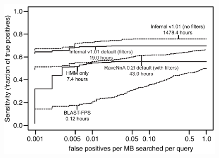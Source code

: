 \documentclass[11pt]{article}
\begin{document}
\newpage

\begin{figure}
\begin{center}
\includegraphics[width=6.4in]{figs/roc}

\label{Fig:roc}
\end{center}
\end{figure}

\newpage

\begin{table}
\begin{center}
\scriptsize

\normalsize
\end{center}

\label{Tab:merlist}
\end{table}


\begin{table}
\begin{center}
\scriptsize

\normalsize
\end{center}

\label{Tab:survcat}
\end{table}


\begin{table}
\begin{center}
\scriptsize

\normalsize
\end{center}

\label{Tab:evaries}
\end{table}
\end{document}
